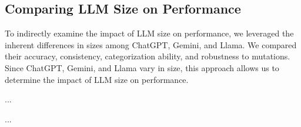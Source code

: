 \documentclass[times, 10pt,twocolumn]{article}
\begin{document}
\subsection{Comparing LLM Size on Performance}
To indirectly examine the impact of LLM size on performance, we leveraged the inherent differences in sizes among ChatGPT, Gemini, and Llama. We compared their accuracy, consistency, categorization ability, and robustness to mutations. Since ChatGPT, Gemini, and Llama vary in size, this approach allows us to determine the impact of LLM size on performance.

...


...





\pagebreak
\end{document}
